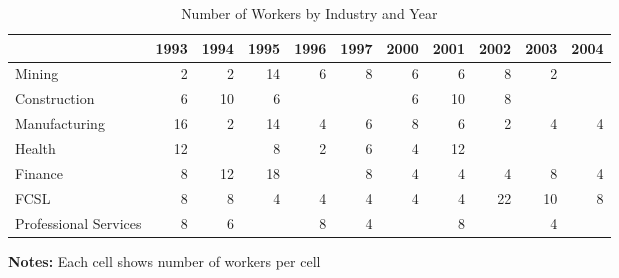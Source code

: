 \documentclass{article}
\begin{document}
\begin{table}[htbp] 
\centering 
\begin{threeparttable} 
\caption{Number of Workers by Industry and Year} 

\centering
\begin{tabular}{lllllllllll}
\toprule
\multicolumn{1}{c}{} &
  \multicolumn{1}{r}{1993} &
  \multicolumn{1}{r}{1994} &
  \multicolumn{1}{r}{1995} &
  \multicolumn{1}{r}{1996} &
  \multicolumn{1}{r}{1997} &
  \multicolumn{1}{r}{2000} &
  \multicolumn{1}{r}{2001} &
  \multicolumn{1}{r}{2002} &
  \multicolumn{1}{r}{2003} &
  \multicolumn{1}{r}{2004} \\
\midrule
\multicolumn{1}{l}{Mining} &
  \multicolumn{1}{r}{2} &
  \multicolumn{1}{r}{2} &
  \multicolumn{1}{r}{14} &
  \multicolumn{1}{r}{6} &
  \multicolumn{1}{r}{8} &
  \multicolumn{1}{r}{6} &
  \multicolumn{1}{r}{6} &
  \multicolumn{1}{r}{8} &
  \multicolumn{1}{r}{2} &
  \multicolumn{1}{r}{} \\
\multicolumn{1}{l}{Construction} &
  \multicolumn{1}{r}{6} &
  \multicolumn{1}{r}{10} &
  \multicolumn{1}{r}{6} &
  \multicolumn{1}{r}{} &
  \multicolumn{1}{r}{} &
  \multicolumn{1}{r}{6} &
  \multicolumn{1}{r}{10} &
  \multicolumn{1}{r}{8} &
  \multicolumn{1}{r}{} &
  \multicolumn{1}{r}{} \\
\multicolumn{1}{l}{Manufacturing} &
  \multicolumn{1}{r}{16} &
  \multicolumn{1}{r}{2} &
  \multicolumn{1}{r}{14} &
  \multicolumn{1}{r}{4} &
  \multicolumn{1}{r}{6} &
  \multicolumn{1}{r}{8} &
  \multicolumn{1}{r}{6} &
  \multicolumn{1}{r}{2} &
  \multicolumn{1}{r}{4} &
  \multicolumn{1}{r}{4} \\
\multicolumn{1}{l}{Health} &
  \multicolumn{1}{r}{12} &
  \multicolumn{1}{r}{} &
  \multicolumn{1}{r}{8} &
  \multicolumn{1}{r}{2} &
  \multicolumn{1}{r}{6} &
  \multicolumn{1}{r}{4} &
  \multicolumn{1}{r}{12} &
  \multicolumn{1}{r}{} &
  \multicolumn{1}{r}{} &
  \multicolumn{1}{r}{} \\
\multicolumn{1}{l}{Finance} &
  \multicolumn{1}{r}{8} &
  \multicolumn{1}{r}{12} &
  \multicolumn{1}{r}{18} &
  \multicolumn{1}{r}{} &
  \multicolumn{1}{r}{8} &
  \multicolumn{1}{r}{4} &
  \multicolumn{1}{r}{4} &
  \multicolumn{1}{r}{4} &
  \multicolumn{1}{r}{8} &
  \multicolumn{1}{r}{4} \\
\multicolumn{1}{l}{FCSL} &
  \multicolumn{1}{r}{8} &
  \multicolumn{1}{r}{8} &
  \multicolumn{1}{r}{4} &
  \multicolumn{1}{r}{4} &
  \multicolumn{1}{r}{4} &
  \multicolumn{1}{r}{4} &
  \multicolumn{1}{r}{4} &
  \multicolumn{1}{r}{22} &
  \multicolumn{1}{r}{10} &
  \multicolumn{1}{r}{8} \\
\multicolumn{1}{l}{Professional Services} &
  \multicolumn{1}{r}{8} &
  \multicolumn{1}{r}{6} &
  \multicolumn{1}{r}{} &
  \multicolumn{1}{r}{8} &
  \multicolumn{1}{r}{4} &
  \multicolumn{1}{r}{} &
  \multicolumn{1}{r}{8} &
  \multicolumn{1}{r}{} &
  \multicolumn{1}{r}{4} &
  \multicolumn{1}{r}{} \\
\bottomrule
\end{tabular}

 \footnotesize  
\textbf{Notes:} Each cell shows number of workers per cell 
\end{threeparttable} 
\end{table}
\end{document}
